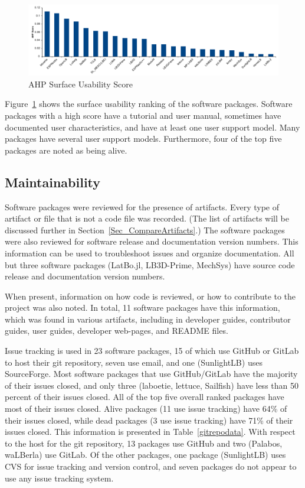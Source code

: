 \documentclass[final, 3p, times, authoryear]{elsarticle}
\begin{document}
\begin{figure}[h!]
	\begin{center}
		\includegraphics[width=1.0\textwidth]{./figures/usability_chart.pdf}
		\caption{AHP Surface Usability Score}
		\label{Fig_Usability}
	\end{center}
\end{figure}

Figure~\ref{Fig_Usability} shows the surface usability ranking of the software
packages. Software packages with a high score have a tutorial and user manual,
sometimes have documented user characteristics, and have at least one user
support model. Many packages have several user support models. Furthermore, four
of the top five packages are noted as being alive. 

\subsection{Maintainability} \label{Sec_Maintainability}

Software packages were reviewed for the presence of artifacts. Every type of
artifact or file that is not a code file was recorded. (The list of artifacts
will be discussed further in Section~\ref{Sec_CompareArtifacts}.)  The software
packages were also reviewed for software release and documentation version
numbers. This information can be used to troubleshoot issues and organize
documentation. All but three software packages (LatBo.jl, LB3D-Prime, MechSys)
have source code release and documentation version numbers.

When present, information on how code is reviewed, or how to contribute to the
project was also noted. In total, 11 software packages have this information,
which was found in various artifacts, including in developer guides, contributor
guides, user guides, developer web-pages, and README files. 

Issue tracking is used in 23 software packages, 15 of which use GitHub or GitLab
to host their git repository, seven use email, and one (SunlightLB) uses
SourceForge. Most software packages that use GitHub/GitLab have the majority of
their issues closed, and only three (laboetie, lettuce, Sailfish) have less than
50 percent of their issues closed. All of the top five overall ranked packages
have most of their issues closed. Alive packages (11 use issue tracking) have
64\% of their issues closed, while dead packages (3 use issue tracking) have
71\% of their issues closed. This information is presented in
Table~\ref{gitrepodata}. With respect to the host for the git repository, 13
packages use GitHub and two (Palabos, waLBerla) use GitLab. Of the other
packages, one package (SunlightLB) uses CVS for issue tracking and version
control, and seven packages do not appear to use any issue tracking system.
\end{document}
